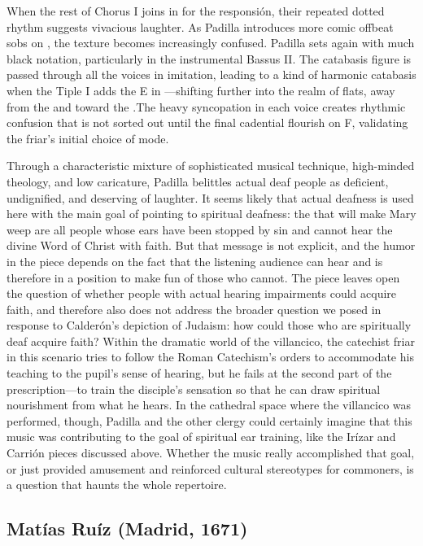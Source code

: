 When the rest of Chorus I joins in for the responsión, their repeated dotted rhythm suggests vivacious laughter.
As Padilla introduces more comic offbeat sobs on , the texture becomes increasingly confused.
Padilla sets  again with much black notation, particularly in the instrumental Bassus II.
The catabasis figure is passed through all the voices in imitation, leading to a kind of harmonic catabasis when the Tiple I adds the E\fl{} in ---shifting further into the realm of flats, away from the  and toward the .\citXXX[chafe?]
The heavy syncopation in each voice creates rhythmic confusion that is not sorted out until the final cadential flourish on F, validating the friar's initial choice of mode.

Through a characteristic mixture of sophisticated musical technique, high-minded theology, and low caricature, Padilla belittles actual deaf people as deficient, undignified, and deserving of laughter.
It seems likely that actual deafness is used here with the main goal of pointing to spiritual deafness: the  that will make Mary weep are all people whose ears have been stopped by sin and cannot hear the divine Word of Christ with faith.
But that message is not explicit, and the humor in the piece depends on the fact that the listening audience can hear and is therefore in a position to make fun of those who cannot.
The piece leaves open the question of whether people with actual hearing impairments could acquire faith, and therefore also does not address the broader question we posed in response to Calderón's depiction of Judaism: how could those who are spiritually deaf acquire faith?
Within the dramatic world of the villancico, the catechist friar in this scenario tries to follow the Roman Catechism's orders to accommodate his teaching to the pupil's sense of hearing, but he fails at the second part of the prescription---to train the disciple's sensation so that he can draw spiritual nourishment from what he hears.
In the cathedral space where the villancico was performed, though, Padilla and the other clergy could certainly imagine that this music was contributing to the goal of spiritual ear training, like the Irízar and Carrión pieces discussed above.
Whether the music really accomplished that goal, or just provided amusement and reinforced cultural stereotypes for commoners, is a question that haunts the whole repertoire.

\subsection{Matías Ruíz (Madrid, 1671)}


